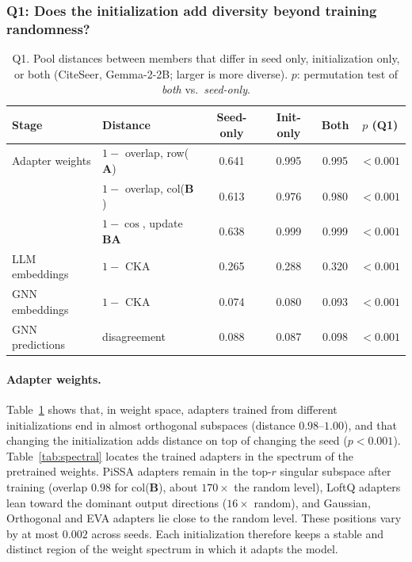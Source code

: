 \documentclass[a4paper,fleqn]{cas-sc}
\DeclareRobustCommand{\revcommon}[2][]{\textcolor{revshared}{#2}} %
\begin{document}
\subsubsection{\revcommon{Q1: Does the initialization add diversity beyond training randomness?}}\label{sec:initQ1}

\begin{table}[t]
\centering\color{revshared}
\caption{Q1. Pool distances between members that differ in seed only, initialization only, or both (CiteSeer, Gemma-2-2B; larger is more diverse). $p$: permutation test of \emph{both} vs.\ \emph{seed-only}.}
\label{tab:seed_vs_init}
\small
\begin{tabular*}{\textwidth}{@{\extracolsep{\fill}} llcccc @{}}
\toprule
\textbf{Stage} & \textbf{Distance} & \textbf{Seed-only} & \textbf{Init-only} & \textbf{Both} & \textbf{$p$ (Q1)} \\
\midrule
Adapter weights & $1-$ overlap, row($\mathbf{A}$) & 0.641 & 0.995 & 0.995 & $<0.001$ \\
                & $1-$ overlap, col($\mathbf{B}$) & 0.613 & 0.976 & 0.980 & $<0.001$ \\
                & $1-\cos$, update $\mathbf{B}\mathbf{A}$ & 0.638 & 0.999 & 0.999 & $<0.001$ \\
\midrule
LLM embeddings  & $1-$ CKA & 0.265 & 0.288 & 0.320 & $<0.001$ \\
GNN embeddings  & $1-$ CKA & 0.074 & 0.080 & 0.093 & $<0.001$ \\
GNN predictions & disagreement & 0.088 & 0.087 & 0.098 & $<0.001$ \\
\bottomrule
\end{tabular*}
\end{table}

\paragraph{\revcommon{Adapter weights.}}
\revcommon[R1,R2,R4]{Table~\ref{tab:seed_vs_init} shows that, in weight space, adapters trained from different initializations end in almost orthogonal subspaces (distance $0.98$--$1.00$), and that changing the initialization adds distance on top of changing the seed ($p<0.001$). Table~\ref{tab:spectral} locates the trained adapters in the spectrum of the pretrained weights. PiSSA adapters remain in the top-$r$ singular subspace after training (overlap $0.98$ for col($\mathbf{B}$), about $170\times$ the random level), LoftQ adapters lean toward the dominant output directions ($16\times$ random), and Gaussian, Orthogonal and EVA adapters lie close to the random level. These positions vary by at most $0.002$ across seeds. Each initialization therefore keeps a stable and distinct region of the weight spectrum in which it adapts the model.}
\end{document}
